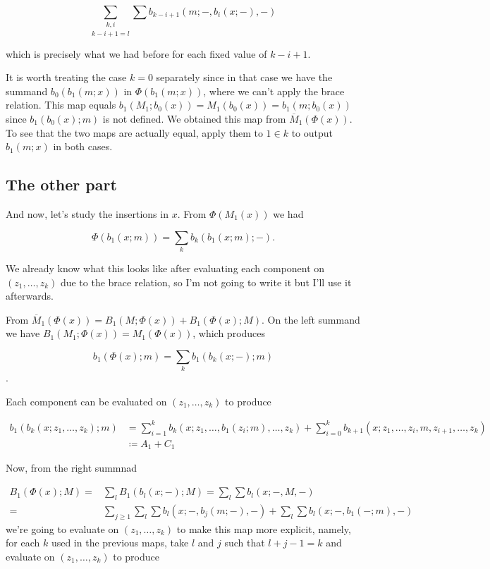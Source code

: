 \documentclass[twoside]{article}
\begin{document}
$$\underset{k-i+1=l}{\sum_{k,i}}\sum b_{k-i+1}(m;-,b_i(x;-),-)$$

which is precisely what we had before for each fixed value of $k-i+1$. %

It is worth treating the case $k=0$ separately since in that case we have the summand $b_0(b_1(m;x))$ in $\Phi(b_1(m;x))$, where we can't apply the brace relation. This map equals $b_1(M_1;b_0(x))=M_1(b_0(x))=b_1(m;b_0(x))$ since $b_1(b_0(x);m)$ is not defined. We obtained this map from $\overline{M}_1(\Phi(x))$. To see that the two maps are actually equal, apply them to $1\in k$ to output $b_1(m;x)$ in both cases. %

\subsection{The other part}

And now, let's study the insertions in $x$. From $\Phi(M_1(x))$ we had 

$$\Phi(b_1(x;m))=\sum_k b_k(b_1(x;m);-).$$

We already know what this looks like after evaluating each component on $(z_1,\dots, z_k)$ due to the brace relation, so I'm not going to write it but I'll use it afterwards. 

From $\overline{M}_1(\Phi(x))=B_1(M;\Phi(x))+B_1(\Phi(x);M)$.  On the left summand we have $B_1(M_1;\Phi(x))=M_1(\Phi(x))$, which produces 

$$b_1(\Phi(x);m)=\sum_k b_1(b_k(x;-);m)$$. 

Each component can be evaluated on $(z_1,\dots, z_k)$ to produce

\begin{align*}
b_1(b_k(x;z_1, \dots, z_k);m)&=\sum_{i=1}^k b_k(x;z_1,\dots, b_1(z_i;m),\dots, z_k)+\sum_{i=0}^k b_{k+1}(x;z_1,\dots, z_i,m,z_{i+1},\dots, z_k)\\
&\coloneqq A_1+C_1
\end{align*}

Now, from the right summnad 

\begin{align*}
B_1(\Phi(x);M)=&\sum_l B_1(b_l(x;-);M)=\sum_l\sum b_l(x;-,M,-) \\
=&\sum_{j\geq 1} \sum_l\sum b_l(x;-,b_j(m;-),-)+\sum_l\sum b_l(x;-,b_1(-;m),-)
\end{align*}
 we're going to evaluate on $(z_1,\dots, z_k)$ to make this map more explicit, namely, for each $k$ used in the previous maps, take $l$ and $j$ such that $l+j-1=k$ and evaluate on $(z_1,\dots, z_k)$ to produce
 
\end{document}
